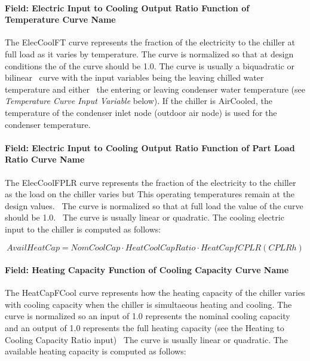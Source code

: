 \paragraph{Field: Electric Input to Cooling Output Ratio Function of Temperature Curve Name}\label{field-electric-input-to-cooling-output-ratio-function-of-temperature-curve-name-2}

The ElecCoolFT curve represents the fraction of the electricity to the chiller at full load as it varies by temperature. The curve is normalized so that at design conditions the of the curve should be 1.0. The curve is usually a biquadratic or bilinear~ curve with the input variables being the leaving chilled water temperature and either~ the entering or leaving condenser water temperature (see \emph{Temperature Curve Input Variable} below). If the chiller is AirCooled, the temperature of the condenser inlet node (outdoor air node) is used for the condenser temperature.

\paragraph{Field: Electric Input to Cooling Output Ratio Function of Part Load Ratio Curve Name}\label{field-electric-input-to-cooling-output-ratio-function-of-part-load-ratio-curve-name-2}

The ElecCoolFPLR curve represents the fraction of the electricity to the chiller as the load on the chiller varies but This operating temperatures remain at the design values.~ The curve is normalized so that at full load the value of the curve should be 1.0.~ The curve is usually linear or quadratic. The cooling electric input to the chiller is computed as follows:

\begin{equation}
AvailHeatCap = NomCoolCap \cdot HeatCoolCapRatio \cdot HeatCapfCPLR(CPLRh)
\end{equation}

\paragraph{Field: Heating Capacity Function of Cooling Capacity Curve Name}\label{field-heating-capacity-function-of-cooling-capacity-curve-name}

The HeatCapFCool curve represents how the heating capacity of the chiller varies with cooling capacity when the chiller is simultaeous heating and cooling. The curve is normalized so an input of 1.0 represents the nominal cooling capacity and an output of 1.0 represents the full heating capacity (see the Heating to Cooling Capacity Ratio input)~ The curve is usually linear or quadratic. The available heating capacity is computed as follows:


